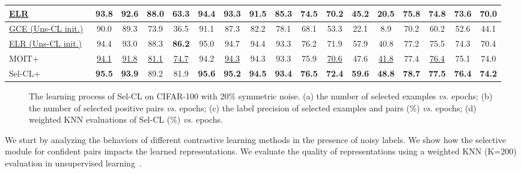 \documentclass[10pt,twocolumn,letterpaper]{article}
\begin{document}
\begin{table*}[h]
\begin{tabular}{l|cccc|cccc|cccc|cccc}
		\underline{ELR}~\cite{LiuNRF20} & 93.8 & 92.6 & 88.0 & 63.3 &  94.4 & 93.3 & 91.5 & 85.3 & 74.5 & 70.2 & 45.2 & 20.5 & 75.8 & 74.8 & 73.6 & 70.0 \\
		\hline		
		\underline{GCE (Uns-CL init.)}~\cite{Ghosh2021} & 90.0 & 89.3 & 73.9 & 36.5 & 91.1 & 87.3 & 82.2 & 78.1 & 68.1 & 53.3 & 22.1 & 8.9 & 70.2 & 60.2 & 52.6 & 44.1 \\		
		\underline{ELR (Uns-CL init.)} & 94.4 & 93.0 & 88.3 & \textbf{86.2} &  {95.0} & {94.7} & {94.4} &  {93.3} & {76.2} & 71.9 & {57.9} & 40.8 & 77.2 & 75.5 & 74.3 & 70.4\\
		MOIT+~\cite{Ortego2021} & \underline{94.1} & \underline{91.8} & \underline{81.1} & \underline{74.7} & 94.2 & \underline{94.3} & 94.3 & 93.3 & {75.9} & \underline{70.6} & {47.6} & \underline{41.8} & 77.4 & \underline{76.4} & 75.1 & 74.0 \\
		\hline			
		Sel-CL+ & \textbf{95.5} & \textbf{93.9} & 89.2 & 81.9 &  \textbf{95.6} &  \textbf{95.2} & \textbf{94.5}  & \textbf{93.4} & \textbf{76.5} & \textbf{72.4} & \textbf{59.6} & \textbf{48.8} & \textbf{78.7} &  \textbf{77.5} & \textbf{76.4}  & \textbf{74.2} \\
		\hline
	\end{tabular}
	\label{cifar10}
\end{table*}

\begin{figure}[h]
	\centering
	\vspace{6pt}
	
	\caption{The learning process of Sel-CL on CIFAR-100 with 20\% symmetric noise. (a) the number of selected examples \textit{vs.} epochs; (b) the number of selected positive pairs \textit{vs.} epochs; (c) the label precision of selected examples and pairs (\%) \textit{vs.} epochs; (d) weighted KNN evaluations of Sel-CL (\%) \textit{vs.} epochs. }
	\label{learning_process}
	\vspace{-5pt}
\end{figure}


We start by analyzing the behaviors of different contrastive learning methods in the presence of noisy labels. We show how the selective module for confident pairs impacts the learned representations. We evaluate the quality of representations using a weighted KNN (K=200) evaluation in unsupervised learning~\cite{HuangDGZ19}. 
\end{document}
